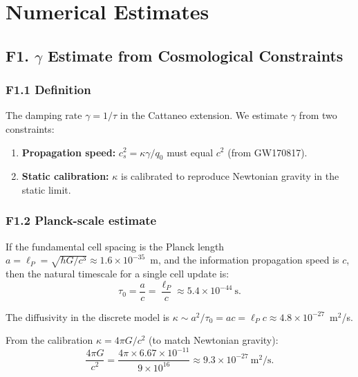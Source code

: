 \documentclass[reprint]{revtex4-2}
\begin{document}
\section{Numerical Estimates}

\subsection{F1. $\gamma$ Estimate from Cosmological Constraints}

\subsubsection{F1.1 Definition}

The damping rate $\gamma = 1/\tau$ in the Cattaneo extension. We estimate $\gamma$ from two constraints:
\begin{enumerate}[label=(\roman*)]
\item \textbf{Propagation speed:} $c_s^2 = \kappa\gamma/q_0$ must equal $c^2$ (from GW170817).
\item \textbf{Static calibration:} $\kappa$ is calibrated to reproduce Newtonian gravity in the static limit.
\end{enumerate}

\subsubsection{F1.2 Planck-scale estimate}

If the fundamental cell spacing is the Planck length $a = \ell_P = \sqrt{\hbar G/c^3} \approx 1.6\times 10^{-35}$~m, and the information propagation speed is $c$, then the natural timescale for a single cell update is:
\begin{equation}
\tau_0 = \frac{a}{c} = \frac{\ell_P}{c} \approx 5.4\times 10^{-44}~\text{s}.
\end{equation}

The diffusivity in the discrete model is $\kappa \sim a^2/\tau_0 = a c = \ell_P c \approx 4.8\times 10^{-27}$~m$^2$/s.

From the calibration $\kappa = 4\pi G/c^2$ (to match Newtonian gravity):
\begin{equation}
\frac{4\pi G}{c^2} = \frac{4\pi \times 6.67\times 10^{-11}}{9\times 10^{16}} \approx 9.3\times 10^{-27}~\text{m}^2/\text{s}.
\end{equation}
\end{document}
